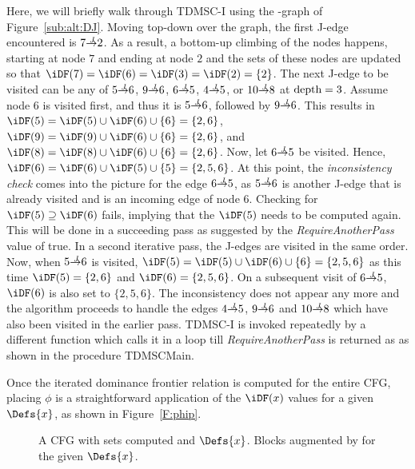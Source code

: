 {%
Here, we will briefly walk through TDMSC-I using the \DJ-graph of 
Figure~\ref{sub:alt:DJ}.  Moving top-down over the graph, the first J-edge 
encountered is $7 \st{J} 2$.  As a result, a bottom-up climbing of the nodes 
happens, starting at node $7$ and ending at node $2$ and the \iDF sets of these 
nodes are updated so that $\iDF(7) = \iDF(6) = \iDF(3) = \iDF(2) = \{2\}$.  The 
next J-edge to be visited can be any of $5 \st{J} 6$, $9 \st{J} 6$, $6 \st{J} 
5$, $4 \st{J} 5$, or $10 \st{J} 8$ at $\textrm{depth} = 3$.  Assume node 
6 is visited first, and thus it is $5 \st{J} 6$, followed by  $9 \st{J} 6$.
This results in $\iDF(5) = \iDF(5) \cup \iDF(6) \cup \{6\} = \{2,6\}$, $\iDF(9) = \iDF(9) \cup \iDF(6) \cup \{6\} = \{2,6\}$, and $\iDF(8) = \iDF(8) \cup \iDF(6) \cup \{6\} = \{2,6\}$.
Now, let $6 \st{J} 5$ be visited. 
Hence, $\iDF(6) = \iDF(6) \cup \iDF(5) \cup \{5\} = \{2,5,6\}$. 
At this point, the \emph{inconsistency check} comes into the picture for the edge $6 \st{J} 5$, as $5 \st{J} 6$ is another J-edge that is already visited and is an incoming edge of node $6$. 
Checking for $\iDF(5) \supseteq \iDF(6)$ fails, implying that the $\iDF(5)$ needs to be computed again. 
This will be done in a succeeding pass as suggested by the \textit{RequireAnotherPass} value of true. 
In a second iterative pass, the J-edges are visited in the same order. 
Now, when $5 \st{J} 6$ is visited, $\iDF(5) = \iDF(5) \cup \iDF(6) \cup \{6\} = \{2,5,6\}$ as this time $\iDF(5) = \{2,6\}$ and $\iDF(6) = \{2,5,6\}$. 
On a subsequent visit of $6 \st{J} 5$, $\iDF(6)$ is also set to $\{2,5,6\}$. 
The inconsistency does not appear any more and the algorithm proceeds to handle the edges $4 \st{J} 5$, $9 \st{J} 6$ and $10 \st{J} 8$ which have also been visited in the earlier pass. 
TDMSC-I is invoked repeatedly by a different function which calls it in a loop till \textit{RequireAnotherPass} is returned as \false as shown in the procedure TDMSCMain.

Once the iterated dominance frontier relation is computed for the entire CFG, placing $\phi$ is a straightforward application of the $\iDF(x)$ values for a given $\Defs{x}$, as shown in Figure~\ref{F:phip}.
\begin{figure}[!ht]
\centering
\begin{minipage}[t]{5in}
   A CFG with \iDF sets computed and $\Defs{x}$.
   Blocks augmented by \phifuns for the given $\Defs{x}$.


\end{minipage}
\end{figure}}
